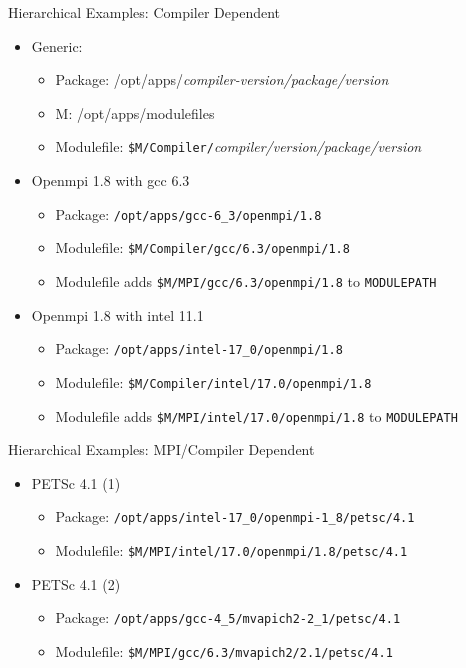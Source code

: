 \documentclass[dvipsnames,aspectratio=169]{beamer}
\begin{document}
\begin{frame}{Hierarchical Examples: Compiler Dependent}
  \begin{itemize}
    \item Generic:
      \begin{itemize}
        \item Package: /opt/apps/\emph{compiler-version/package/version}
        \item M: {\color{blue}/opt/apps/modulefiles}
        \item Modulefile: \texttt{{\color{blue}\$M}/Compiler/}\emph{compiler/version/package/version}
      \end{itemize}
    \item Openmpi 1.8 with gcc 6.3
      \begin{itemize}
        \item Package: \texttt{/opt/apps/gcc-6\_3/openmpi/1.8}
        \item Modulefile: \texttt{{\color{blue}\$M}/Compiler/gcc/6.3/openmpi/1.8}
        \item Modulefile adds \texttt{{\color{blue}\$M}/MPI/gcc/6.3/openmpi/1.8}
          to \texttt{MODULEPATH} \\
      \end{itemize}
    \item Openmpi 1.8 with intel 11.1
      \begin{itemize}
        \item Package: \texttt{/opt/apps/intel-17\_0/openmpi/1.8}
        \item Modulefile: \texttt{{\color{blue}\$M}/Compiler/intel/17.0/openmpi/1.8}
        \item Modulefile adds \texttt{\$M/MPI/intel/17.0/openmpi/1.8}
          to \texttt{MODULEPATH}
      \end{itemize}
  \end{itemize}
\end{frame}

\begin{frame}{Hierarchical Examples: MPI/Compiler Dependent}
  \begin{itemize}
    \item PETSc 4.1 (1)
      \begin{itemize}
        \item Package: \texttt{/opt/apps/intel-17\_0/openmpi-1\_8/petsc/4.1}
        \item Modulefile: \texttt{{\color{blue}\$M}/MPI/intel/17.0/openmpi/1.8/petsc/4.1}
      \end{itemize}
    \item PETSc 4.1 (2)
      \begin{itemize}
        \item Package: \texttt{/opt/apps/gcc-4\_5/mvapich2-2\_1/petsc/4.1}
        \item Modulefile: \texttt{{\color{blue}\$M}/MPI/gcc/6.3/mvapich2/2.1/petsc/4.1}
      \end{itemize}
  \end{itemize}
\end{frame}
\end{document}
